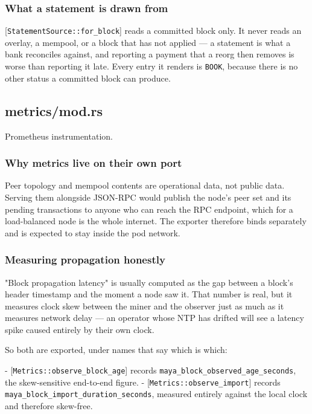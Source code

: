 \documentclass[11pt,a4paper]{article}
\begin{document}
\subsubsection{What a statement is drawn from}

[\texttt{StatementSource::for\_block}] reads a committed block only. It never reads
an overlay, a mempool, or a block that has not applied — a
statement is what a bank reconciles against, and reporting a payment that a
reorg then removes is worse than reporting it late. Every entry it renders
is \texttt{BOOK}, because there is no other status a committed block can produce.

\subsection{metrics/mod.rs}
Prometheus instrumentation.

\subsubsection{Why metrics live on their own port}

Peer topology and mempool contents are operational data, not public data.
Serving them alongside JSON-RPC would publish the node's peer set and its
pending transactions to anyone who can reach the RPC endpoint, which for a
load-balanced node is the whole internet. The exporter therefore binds
separately and is expected to stay inside the pod network.

\subsubsection{Measuring propagation honestly}

"Block propagation latency" is usually computed as the gap between a block's
header timestamp and the moment a node saw it. That number is real, but it
measures clock skew between the miner and the observer just as much as it
measures network delay — an operator whose NTP has drifted will see a
latency spike caused entirely by their own clock.

So both are exported, under names that say which is which:

- [\texttt{Metrics::observe\_block\_age}] records \texttt{maya\_block\_observed\_age\_seconds},
  the skew-sensitive end-to-end figure.
- [\texttt{Metrics::observe\_import}] records \texttt{maya\_block\_import\_duration\_seconds},
  measured entirely against the local clock and therefore skew-free.
\end{document}
